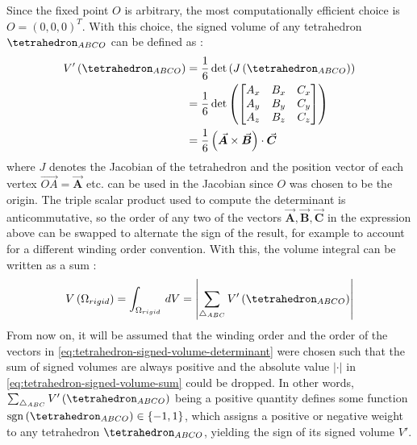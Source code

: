 \documentclass[oneside, a4paper]{book}
\newcommand\abs[1]{\left|#1\right|}
\newcommand\vek[1]{\vec{\bm{#1}}}
\newcommand\br[1]{\left(#1\right)}
\DeclareMathOperator{\sgn}{sgn}
\begin{document}
  Since the fixed point $O$ is arbitrary, the most computationally efficient choice is $O=\br{0,0,0}^T$. With this choice, the signed volume of any tetrahedron $\tetrahedron_{ABCO}$ can be defined as \autocites{efficient-feature-extraction}{explicit-exact-tetrahedron-formulas}:
  \begin{align}
    V'\br{\tetrahedron_{ABCO}} &= \frac{1}{6}\det\br{J\br{\tetrahedron_{ABCO}}}\\
    &= \frac{1}{6}\det\br{\begin{bmatrix}
    A_x&B_x&C_x\\A_y&B_y&C_y\\A_z&B_z&C_z
    \end{bmatrix}}\\
    &= \frac{1}{6}\br{\vek{A} \times \vek{B}} \cdot \vek{C}\label{eq:tetrahedron-signed-volume-determinant}
  \end{align}
  where $J$ denotes the Jacobian of the tetrahedron and the position vector of each vertex $\overrightarrow{OA}=\vek{A}$ etc. can be used in the Jacobian since $O$ was chosen to be the origin. The triple scalar product used to compute the determinant is anticommutative, so the order of any two of the vectors $\vek{A},\vek{B},\vek{C}$ in the expression above can be swapped to alternate the sign of the result, for example to account for a different winding order convention. With this, the volume integral can be written as a sum \autocite{efficient-feature-extraction}:
  \begin{equation}\label{eq:tetrahedron-signed-volume-sum}
    V\br{\Omega_{rigid}} = \int_{\Omega_{rigid}} \,dV = \abs{\sum_{\triangle_{ABC}} V'\br{\tetrahedron_{ABCO}}}
  \end{equation}
  From now on, it will be assumed that the winding order and the order of the vectors in \autoref{eq:tetrahedron-signed-volume-determinant} were chosen such that the sum of signed volumes are always positive and the absolute value $\abs{\cdot}$ in \autoref{eq:tetrahedron-signed-volume-sum} could be dropped. In other words, $\sum_{\triangle_{ABC}} V'\br{\tetrahedron_{ABCO}}$ being a positive quantity defines some function $\sgn\br{\tetrahedron_{ABCO}}\in\{-1,1\}$, which assigns a positive or negative weight to any tetrahedron $\tetrahedron_{ABCO}$, yielding the sign of its signed volume $V'$.
\end{document}
